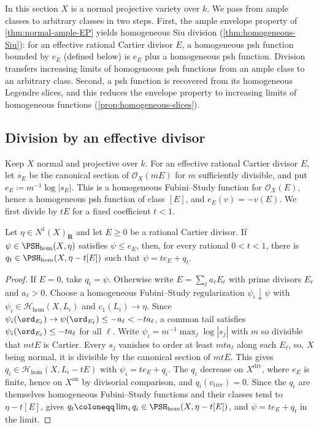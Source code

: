 \documentclass[11pt,a4paper]{article}
\newcommand{\an}{\mathrm{an}}          %
\newcommand{\divv}{\mathrm{div}}       %
\newcommand{\vtriv}{v_{\mathrm{triv}}} %
\newcommand{\PSHhom}{\PSH_{\mathrm{hom}}}          %
\begin{document}
In this section $X$ is a normal projective variety over $k$. We pass from ample classes to arbitrary classes in two steps. First, the ample envelope property of \cref{thm:normal-ample-EP} yields homogeneous Siu division (\cref{thm:homogeneous-Siu}): for an effective rational Cartier divisor $E$, a homogeneous psh function bounded by $e_E$ (defined below) is $e_E$ plus a homogeneous psh function. Division transfers increasing limits of homogeneous psh functions from an ample class to an arbitrary class. Second, a psh function is recovered from its homogeneous Legendre slices, and this reduces the envelope property to increasing limits of homogeneous functions (\cref{prop:homogeneous-slices}).

\subsection{Division by an effective divisor}

Keep $X$ normal and projective over $k$. For an effective rational Cartier divisor $E$, let $s_E$ be the canonical section of $\mathcal O_X(mE)$ for $m$ sufficiently divisible, and put $e_E\coloneqq m^{-1}\log|s_E|$. This is a homogeneous Fubini--Study function for $\mathcal O_X(E)$, hence a homogeneous psh function of class $[E]$, and $e_E(v)=-v(E)$. We first divide by $tE$ for a fixed coefficient $t<1$.

\begin{lemma}\label{lem:fixed-coefficient-division}
Let $\eta\in N^1(X)_{\mathbf R}$ and let $E\geq0$ be a rational Cartier divisor. If $\psi\in\PSHhom(X,\eta)$ satisfies $\psi\leq e_E$, then, for every rational $0<t<1$, there is $q_t\in\PSHhom(X,\eta-t[E])$ such that $\psi=te_E+q_t$.
\end{lemma}

\begin{proof}
If $E=0$, take $q_t=\psi$. Otherwise write $E=\sum_\ell a_\ell E_\ell$ with prime divisors $E_\ell$ and $a_\ell>0$. Choose a homogeneous Fubini--Study regularization $\psi_i\downarrow\psi$ with $\psi_i\in\mathcal{H}_{\mathrm{hom}}(X,L_i)$ and $c_1(L_i)\to\eta$. Since $\psi_i(\ord_{E_\ell})\to\psi(\ord_{E_\ell})\le-a_\ell<-ta_\ell$, a common tail satisfies $\psi_i(\ord_{E_\ell})\le-ta_\ell$ for all $\ell$. Write $\psi_i=m^{-1}\max_j\log|s_j|$ with $m$ so divisible that $mtE$ is Cartier. Every $s_j$ vanishes to order at least $mta_\ell$ along each $E_\ell$, so, $X$ being normal, it is divisible by the canonical section of $mtE$. This gives $q_i\in\mathcal{H}_{\mathrm{hom}}(X,L_i-tE)$ with $\psi_i=te_E+q_i$. The $q_i$ decrease on $X^{\divv}$, where $e_E$ is finite, hence on $X^{\an}$ by divisorial comparison, and $q_i(\vtriv)=0$. Since the $q_i$ are themselves homogeneous Fubini--Study functions and their classes tend to $\eta-t[E]$, \cite[Definition~4.1]{BJ22} gives $q_t\coloneqq\lim_iq_i\in\PSHhom(X,\eta-t[E])$, and $\psi=te_E+q_t$ in the limit.
\end{proof}
\end{document}
